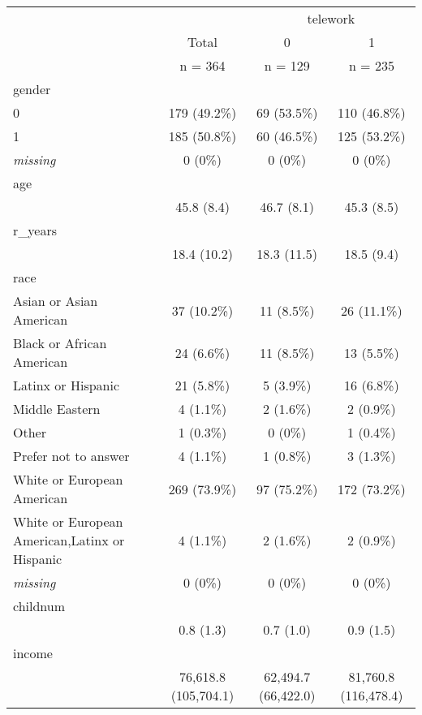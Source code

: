 \documentclass[
]{article}
\begin{document}
\begin{table}[ ht ] 
\centering 
\caption{}\label{}
\begin{tabular}{ l c c c }
\toprule
 &   &  \multicolumn{ 2 }{c}{ telework }\\ 
  & Total & 0 & 1 \\ 
 & n = 364 & n = 129 & n = 235 \\ 
 \midrule
gender &   &   &  \\ 
\hspace{6pt}    0 & 179 (49.2\%) & 69 (53.5\%) & 110 (46.8\%)\\ 
\hspace{6pt}    1 & 185 (50.8\%) & 60 (46.5\%) & 125 (53.2\%)\\ 
\hspace{6pt}    \emph{missing} & 0 (0\%) & 0 (0\%) & 0 (0\%)\\ 
age &   &   &  \\ 
\hspace{6pt}   & 45.8 (8.4) & 46.7 (8.1) & 45.3 (8.5)\\ 
r\_years &   &   &  \\ 
\hspace{6pt}   & 18.4 (10.2) & 18.3 (11.5) & 18.5 (9.4)\\ 
race &   &   &  \\ 
\hspace{6pt}    Asian or Asian American & 37 (10.2\%) & 11 (8.5\%) & 26 (11.1\%)\\ 
\hspace{6pt}    Black or African American & 24 (6.6\%) & 11 (8.5\%) & 13 (5.5\%)\\ 
\hspace{6pt}    Latinx or Hispanic & 21 (5.8\%) & 5 (3.9\%) & 16 (6.8\%)\\ 
\hspace{6pt}    Middle Eastern & 4 (1.1\%) & 2 (1.6\%) & 2 (0.9\%)\\ 
\hspace{6pt}    Other & 1 (0.3\%) & 0 (0\%) & 1 (0.4\%)\\ 
\hspace{6pt}    Prefer not to answer & 4 (1.1\%) & 1 (0.8\%) & 3 (1.3\%)\\ 
\hspace{6pt}    White or European American & 269 (73.9\%) & 97 (75.2\%) & 172 (73.2\%)\\ 
\hspace{6pt}    White or European American,Latinx or Hispanic & 4 (1.1\%) & 2 (1.6\%) & 2 (0.9\%)\\ 
\hspace{6pt}    \emph{missing} & 0 (0\%) & 0 (0\%) & 0 (0\%)\\ 
childnum &   &   &  \\ 
\hspace{6pt}   & 0.8 (1.3) & 0.7 (1.0) & 0.9 (1.5)\\ 
income &   &   &  \\ 
\hspace{6pt}   & 76,618.8 (105,704.1) & 62,494.7 (66,422.0) & 81,760.8 (116,478.4)\\ 
\bottomrule


\end{tabular}
\end{table}
\end{document}

